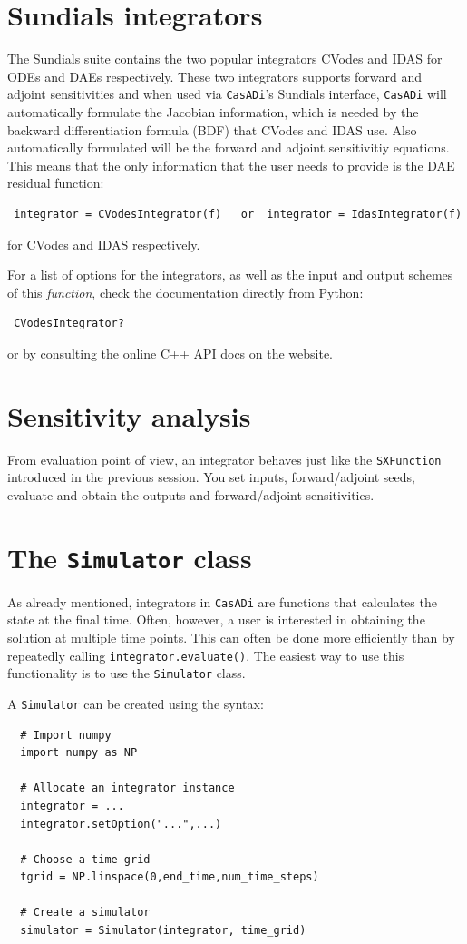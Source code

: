 \documentclass[a4paper,12pt]{book}
\newcommand{\CasADi}{\texttt{CasADi}\xspace}
\begin{document}
\section{Sundials integrators}
The Sundials suite contains the two popular integrators CVodes and IDAS for ODEs and DAEs respectively. These two integrators supports forward and adjoint sensitivities and when used via \CasADi's Sundials interface, \CasADi will automatically formulate the Jacobian information, which is needed by the backward differentiation formula (BDF) that CVodes and IDAS use. Also automatically formulated will be the forward and adjoint sensitivitiy equations. This means that the only information that the user needs to provide is the DAE residual function:
\begin{verbatim}
 integrator = CVodesIntegrator(f)   or  integrator = IdasIntegrator(f)
\end{verbatim}
for CVodes and IDAS respectively.

For a list of options for the integrators, as well as the input and output schemes of this \emph{function}, check the documentation directly from Python:
\begin{verbatim}
 CVodesIntegrator?
\end{verbatim}
or by consulting the online C++ API docs on the website.

\section{Sensitivity analysis}
From evaluation point of view, an integrator behaves just like the \texttt{SXFunction} introduced in the previous session. You set inputs, forward/adjoint seeds, evaluate and obtain the outputs and forward/adjoint sensitivities.

\section{The \texttt{Simulator} class}
As already mentioned, integrators in \CasADi are functions that calculates the state at the final time. Often, however, a user is interested in obtaining the solution at multiple time points. This can often be done more efficiently than by repeatedly calling \texttt{integrator.evaluate()}. The easiest way to use this functionality is to use the \texttt{Simulator} class.

A \texttt{Simulator} can be created using the syntax:
\begin{verbatim}
  # Import numpy
  import numpy as NP

  # Allocate an integrator instance
  integrator = ...
  integrator.setOption("...",...)

  # Choose a time grid
  tgrid = NP.linspace(0,end_time,num_time_steps)

  # Create a simulator
  simulator = Simulator(integrator, time_grid)
\end{verbatim}
\end{document}
